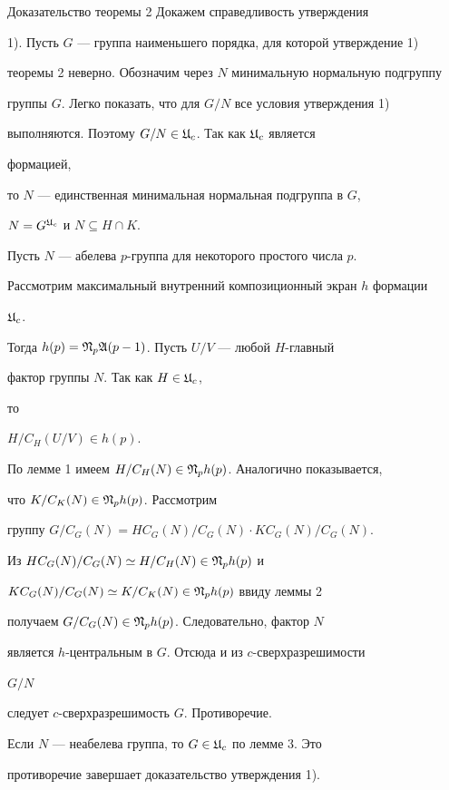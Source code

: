 \begin{pf*}{Доказательство теоремы 2} Докажем справедливость утверждения


1). Пусть $G$ --- группа наименьшего порядка, для которой утверждение 1)


теоремы 2 неверно. Обозначим через $N$ минимальную нормальную подгруппу


группы $G$. Легко показать, что для $G/N$ все условия утверждения 1)


выполняются. Поэтому $G/N\in\frak U_c$. Так как $\frak U_c$ является


формацией,


то $N$ --- единственная минимальная нормальная подгруппа в $G$,


$N=G^{\frak U_c}$ и $N\subseteq H\cap K$.





Пусть $N$ --- абелева $p$-группа для некоторого простого числа $p$.


Рассмотрим максимальный внутренний композиционный экран $h$ формации


$\frak U_c$.


Тогда $h(p)=\frak N_p\frak A(p-1)$. Пусть $U/V$ --- любой $H$-главный


фактор группы $N$. Так как $H\in\frak U_c$,


то


$H/C_H(U/V)\in h(p)$.


По лемме 1 имеем $H/C_H(N)\in\frak N_ph(p)$. Аналогично показывается,


что $K/C_K(N)\in\frak N_ph(p)$. Рассмотрим


группу $G/C_G(N)=HC_G(N)/C_G(N)\cdot KC_G(N)/C_G(N)$.


Из $HC_G(N)/C_G(N)\simeq H/C_H(N)\in\frak N_ph(p)$ и


$KC_G(N)/C_G(N)\simeq K/C_K(N)\in\frak N_ph(p)$ ввиду леммы 2


получаем $G/C_G(N)\in\frak N_ph(p)$. Следовательно, фактор $N$


является $h$-центральным в $G$. Отсюда и из $c$-сверхразрешимости


$G/N$


следует $c$-сверхразрешимость $G$. Противоречие.





Если $N$ --- неабелева группа, то $G\in\frak U_c$ по лемме 3. Это


противоречие завершает доказательство утверждения 1).






\end{pf*}
